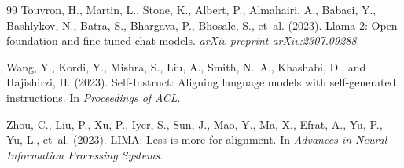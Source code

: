 \documentclass{article}
\begin{document}
\begin{thebibliography}{99}
Touvron, H., Martin, L., Stone, K., Albert, P., Almahairi, A., Babaei, Y., Bashlykov, N., Batra, S., Bhargava, P., Bhosale, S., et~al. (2023).
Llama 2: Open foundation and fine-tuned chat models.
\textit{arXiv preprint arXiv:2307.09288}.

Wang, Y., Kordi, Y., Mishra, S., Liu, A., Smith, N.~A., Khashabi, D., and Hajishirzi, H. (2023).
Self-Instruct: Aligning language models with self-generated instructions.
In \textit{Proceedings of ACL}.

Zhou, C., Liu, P., Xu, P., Iyer, S., Sun, J., Mao, Y., Ma, X., Efrat, A., Yu, P., Yu, L., et~al. (2023).
LIMA: Less is more for alignment.
In \textit{Advances in Neural Information Processing Systems}.

\end{thebibliography}
\end{document}
